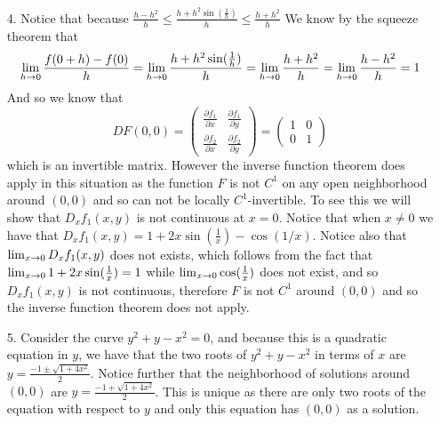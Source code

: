 \documentclass[12pt]{amsart}
\begin{document}
\begin{itemize}
   \item[4. ] Notice that because $\frac{h-h^2}{h}\leq \frac{h+h^2\sin(\frac{1}{h})}{h}\leq \frac{h+h^2}{h}$
              We know by the squeeze theorem that 
              \[\lim_{h\rightarrow 0}\frac{f(0+h)-f(0)}{h}=\lim_{h\rightarrow 0}\frac{h+h^2\sin(\frac{1}{h})}{h}
              =\lim_{h\rightarrow 0}\frac{h+h^2}{h}=\lim_{h\rightarrow 0}\frac{h-h^2}{h}=1\]
              And so we know that
              \[DF(0,0)= \begin{pmatrix}
               \frac{\partial f_1}{\partial x} & \frac{\partial f_1}{\partial y}\\ 
               \frac{\partial f_2}{\partial x} & \frac{\partial f_2}{\partial y}
               \end{pmatrix}  = 
               \begin{pmatrix}1 & 0\\ 0 & 1\end{pmatrix}\]
              which is an invertible matrix. However the inverse function theorem does
              apply in this situation as the function $F$ is not $C^1$ on any open 
              neighborhood around $(0,0)$ and so can not be locally $C^1$-invertible. 
              To see this we will show that $D_xf_1(x,y)$ is not continuous at $x=0$.
              Notice that when $x\neq 0$ we have that $D_xf_1(x,y)=1+2x\sin(\frac{1}{x})-\cos(1/x)$. Notice also that 
              $\lim_{x\rightarrow0}D_xf_1(x,y)$ does not exists, which follows from the fact that 
              $\lim_{x\rightarrow 0} 1+2x\sin(\frac{1}{x})=1$ while $\lim_{x\rightarrow 0}\cos(\frac{1}{x})$ 
              does not exist, and so $D_xf_1(x,y)$ is not continuous, therefore $F$ is not $C^1$ around $(0,0)$
              and so the inverse function theorem does not apply.


   \item[5.] Consider the curve $y^2+y-x^2=0$, and because this is a quadratic equation in 
         $y$, we have that the two roots of $y^2+y-x^2$ in terms of $x$ are 
         $y=\frac{-1\pm \sqrt{1+4x^2}}{2}$. Notice further that the neighborhood of solutions around $(0,0)$
         are $y=\frac{-1+ \sqrt{1+4x^2}}{2}$.
         This is unique as there are only two roots of the equation with respect to 
         $y$ and only this equation has $(0,0)$ as a solution.


\end{itemize}
\end{document}
